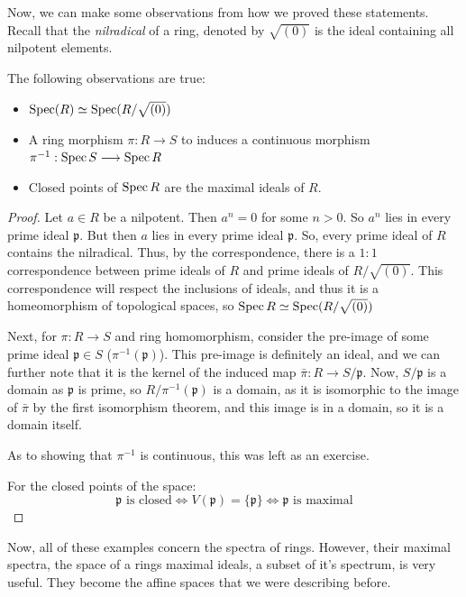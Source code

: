 Now, we can make some observations from how we proved these statements.
Recall that the \emph{nilradical} of a ring, denoted by \(\sqrt{(0)}\) is the ideal containing all nilpotent elements.
\begin{theorem}
    The following observations are true:
    \begin{itemize}
        \item $\operatorname{Spec} (R) \simeq \operatorname{Spec} (R/\sqrt{(0)})$
        \item A ring morphism $\pi: R \longrightarrow S$ to induces a continuous morphism $\pi^{-1}: \operatorname{Spec} S \longrightarrow \operatorname{Spec} R$
        \item Closed points of \(\operatorname{Spec} R\) are the maximal ideals of \(R\).
    \end{itemize}
\end{theorem}
\begin{proof}
  Let \(a \in R\) be a nilpotent.
  Then \(a^n = 0\) for some \(n > 0\).
  So \(a^n \) lies in every prime ideal \(\mathfrak{p}\).
  But then \(a\) lies in every prime ideal \(\mathfrak{p}\).
  So, every prime ideal of \(R\) contains the nilradical.
  Thus, by the correspondence, there is a $1:1$ correspondence between prime ideals of $R$ and prime ideals of $R/\sqrt{(0)}$. This correspondence will respect the inclusions of ideals, and thus it is a homeomorphism of topological spaces, so $\operatorname{Spec} R \simeq \operatorname{Spec} (R/\sqrt{(0)})$

    Next, for $\pi : R \longrightarrow S$ and ring homomorphism, consider the pre-image of some prime ideal $\mathfrak{p} \in S$ ($\pi^{-1}(\mathfrak{p})$). This pre-image is definitely an ideal, and we can further note that it is the kernel of the induced map $\bar{\pi} : R \longrightarrow S / \mathfrak{p}$. Now, $S / \mathfrak{p}$ is a domain as $\mathfrak{p}$ is prime, so $R / \pi^{-1}(\mathfrak{p})$ is a domain, as it is isomorphic to the image of $\bar{\pi}$ by the first isomorphism theorem, and this image is in a domain, so it is a domain itself.

    As to showing that $\pi^{-1}$ is continuous, this was left as an exercise.

    For the closed points of the space:
    \[ \mathfrak{p} \textrm{ is closed} \iff V(\mathfrak{p}) = \{\mathfrak{p}\} \iff \mathfrak{p} \textrm{ is maximal} \]
\end{proof}

Now, all of these examples concern the spectra of rings. However, their maximal spectra, the space of a rings maximal ideals, a subset of it's spectrum, is very useful. They become the affine spaces that we were describing before.

